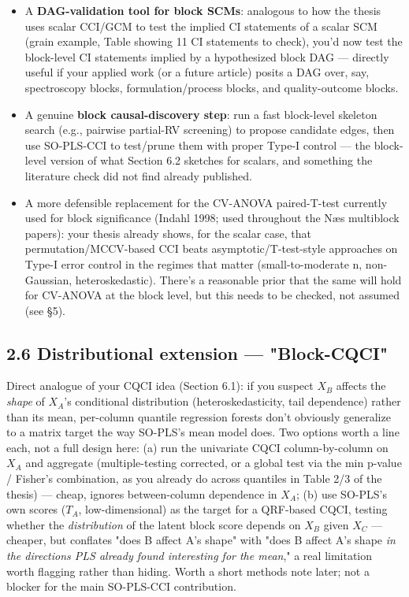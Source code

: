 \documentclass[11pt,a4paper]{article}
\begin{document}
	\begin{itemize}
		\item A \textbf{DAG-validation tool for block SCMs}: analogous to how the thesis uses scalar CCI/GCM to test the implied CI statements of a scalar SCM (grain example, Table showing 11 CI statements to check), you'd now test the block-level CI statements implied by a hypothesized block DAG — directly useful if your applied work (or a future article) posits a DAG over, say, spectroscopy blocks, formulation/process blocks, and quality-outcome blocks.
		\item A genuine \textbf{block causal-discovery step}: run a fast block-level skeleton search (e.g., pairwise partial-RV screening) to propose candidate edges, then use SO-PLS-CCI to test/prune them with proper Type-I control — the block-level version of what Section 6.2 sketches for scalars, and something the literature check did not find already published.
		\item A more defensible replacement for the CV-ANOVA paired-T-test currently used for block significance (Indahl 1998; used throughout the Næs multiblock papers): your thesis already shows, for the scalar case, that permutation/MCCV-based CCI beats asymptotic/T-test-style approaches on Type-I error control in the regimes that matter (small-to-moderate n, non-Gaussian, heteroskedastic). There's a reasonable prior that the same will hold for CV-ANOVA at the block level, but this needs to be checked, not assumed (see \S{}5).
		
	\end{itemize}
	\subsection{2.6 Distributional extension — "Block-CQCI"}
	
	Direct analogue of your CQCI idea (Section 6.1): if you suspect \(X_B\) affects the \emph{shape} of \(X_A\)'s conditional distribution (heteroskedasticity, tail dependence) rather than its mean, per-column quantile regression forests don't obviously generalize to a matrix target the way SO-PLS's mean model does. Two options worth a line each, not a full design here: (a) run the univariate CQCI column-by-column on \(X_A\) and aggregate (multiple-testing corrected, or a global test via the min p-value / Fisher's combination, as you already do across quantiles in Table 2/3 of the thesis) — cheap, ignores between-column dependence in \(X_A\); (b) use SO-PLS's own scores (\(T_A\), low-dimensional) as the target for a QRF-based CQCI, testing whether the \emph{distribution} of the latent block score depends on \(X_B\) given \(X_C\) — cheaper, but conflates "does B affect A's shape" with "does B affect A's shape \emph{in the directions PLS already found interesting for the mean}," a real limitation worth flagging rather than hiding. Worth a short methods note later; not a blocker for the main SO-PLS-CCI contribution.
	
\end{document}
